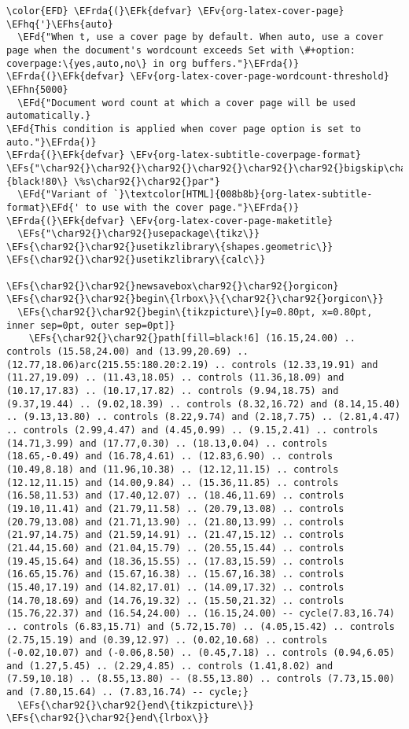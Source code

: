 \documentclass{article}
\newcommand{\EFs}[1]{\textcolor{EFs}{#1}} %
\newcommand{\EFd}[1]{\textcolor{EFd}{#1}} %
\newcommand{\EFk}[1]{\textcolor{EFk}{#1}} %
\newcommand{\EFv}[1]{\textcolor{EFv}{#1}} %
\newcommand{\EFhn}[1]{\textcolor{EFhn}{\textbf{#1}}} %
\newcommand{\EFhq}[1]{#1} %
\newcommand{\EFhs}[1]{\textcolor{EFhs}{#1}} %
\newcommand{\EFrda}[1]{\textcolor{EFrda}{#1}} %
\begin{document}
\begin{Code}
\begin{Verbatim}
\color{EFD} \EFrda{(}\EFk{defvar} \EFv{org-latex-cover-page} \EFhq{'}\EFhs{auto}
  \EFd{"When t, use a cover page by default. When auto, use a cover page when the document's wordcount exceeds Set with \#+option: coverpage:\{yes,auto,no\} in org buffers."}\EFrda{)}
\EFrda{(}\EFk{defvar} \EFv{org-latex-cover-page-wordcount-threshold} \EFhn{5000}
  \EFd{"Document word count at which a cover page will be used automatically.}
\EFd{This condition is applied when cover page option is set to auto."}\EFrda{)}
\EFrda{(}\EFk{defvar} \EFv{org-latex-subtitle-coverpage-format} \EFs{"\char92{}\char92{}\char92{}\char92{}\char92{}\char92{}bigskip\char92{}n\char92{}\char92{}LARGE\char92{}\char92{}mdseries\char92{}\char92{}itshape\char92{}\char92{}color\{black!80\} \%s\char92{}\char92{}par"}
  \EFd{"Variant of `}\textcolor[HTML]{008b8b}{org-latex-subtitle-format}\EFd{' to use with the cover page."}\EFrda{)}
\EFrda{(}\EFk{defvar} \EFv{org-latex-cover-page-maketitle}
  \EFs{"\char92{}\char92{}usepackage\{tikz\}}
\EFs{\char92{}\char92{}usetikzlibrary\{shapes.geometric\}}
\EFs{\char92{}\char92{}usetikzlibrary\{calc\}}

\EFs{\char92{}\char92{}newsavebox\char92{}\char92{}orgicon}
\EFs{\char92{}\char92{}begin\{lrbox\}\{\char92{}\char92{}orgicon\}}
  \EFs{\char92{}\char92{}begin\{tikzpicture\}[y=0.80pt, x=0.80pt, inner sep=0pt, outer sep=0pt]}
    \EFs{\char92{}\char92{}path[fill=black!6] (16.15,24.00) .. controls (15.58,24.00) and (13.99,20.69) .. (12.77,18.06)arc(215.55:180.20:2.19) .. controls (12.33,19.91) and (11.27,19.09) .. (11.43,18.05) .. controls (11.36,18.09) and (10.17,17.83) .. (10.17,17.82) .. controls (9.94,18.75) and (9.37,19.44) .. (9.02,18.39) .. controls (8.32,16.72) and (8.14,15.40) .. (9.13,13.80) .. controls (8.22,9.74) and (2.18,7.75) .. (2.81,4.47) .. controls (2.99,4.47) and (4.45,0.99) .. (9.15,2.41) .. controls (14.71,3.99) and (17.77,0.30) .. (18.13,0.04) .. controls (18.65,-0.49) and (16.78,4.61) .. (12.83,6.90) .. controls (10.49,8.18) and (11.96,10.38) .. (12.12,11.15) .. controls (12.12,11.15) and (14.00,9.84) .. (15.36,11.85) .. controls (16.58,11.53) and (17.40,12.07) .. (18.46,11.69) .. controls (19.10,11.41) and (21.79,11.58) .. (20.79,13.08) .. controls (20.79,13.08) and (21.71,13.90) .. (21.80,13.99) .. controls (21.97,14.75) and (21.59,14.91) .. (21.47,15.12) .. controls (21.44,15.60) and (21.04,15.79) .. (20.55,15.44) .. controls (19.45,15.64) and (18.36,15.55) .. (17.83,15.59) .. controls (16.65,15.76) and (15.67,16.38) .. (15.67,16.38) .. controls (15.40,17.19) and (14.82,17.01) .. (14.09,17.32) .. controls (14.70,18.69) and (14.76,19.32) .. (15.50,21.32) .. controls (15.76,22.37) and (16.54,24.00) .. (16.15,24.00) -- cycle(7.83,16.74) .. controls (6.83,15.71) and (5.72,15.70) .. (4.05,15.42) .. controls (2.75,15.19) and (0.39,12.97) .. (0.02,10.68) .. controls (-0.02,10.07) and (-0.06,8.50) .. (0.45,7.18) .. controls (0.94,6.05) and (1.27,5.45) .. (2.29,4.85) .. controls (1.41,8.02) and (7.59,10.18) .. (8.55,13.80) -- (8.55,13.80) .. controls (7.73,15.00) and (7.80,15.64) .. (7.83,16.74) -- cycle;}
  \EFs{\char92{}\char92{}end\{tikzpicture\}}
\EFs{\char92{}\char92{}end\{lrbox\}}


\end{Verbatim}
\end{Code}
\end{document}
